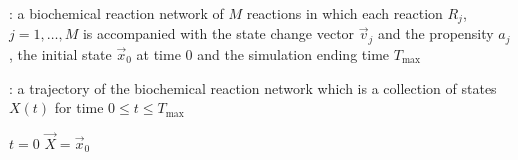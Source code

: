 \begin{algorithm}[H]
\DontPrintSemicolon
{}

\caption{\protect\TitleFunction{}}
\label{algo:ssa-sketch}

\Input: a biochemical reaction network of $M$ reactions in which each reaction $R_j$, $j=1, \dots, M$ is accompanied with the state change vector $\vec{v}_j$ and the propensity $a_j$, the initial state $\vec{x}_0$ at time $0$ and the simulation ending time $T_{\max}$\;

\Output: a trajectory of the biochemical reaction network which is a collection of states $X(t)$ for time $0\le t\le T_{\max}$\;

$t = 0$\;
$\vec{X} = \vec{x}_0$\;


\end{algorithm}
